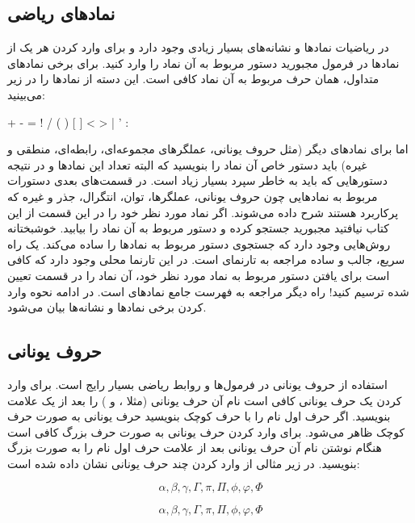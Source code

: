 \subsection{نمادهای ریاضی}
در ریاضیات نمادها و نشانه‌های بسیار زیادی وجود دارد و برای وارد کردن هر یک از
نمادها در فرمول مجبورید دستور مربوط به آن نماد را وارد کنید. برای برخی نمادهای
متداول، همان حرف مربوط به آن نماد کافی است. این دسته از نمادها را در زیر
می‌بینید:
\begin{latex}
+ - = ! / ( ) [ ] < > | ' :
\end{latex} 
اما برای نمادهای دیگر (مثل حروف یونانی، عملگرهای مجموعه‌ای، رابطه‌ای، منطقی و
غیره) باید دستور خاص آن نماد را بنویسید که البته تعداد این نمادها و در نتیجه
دستورهایی که باید به خاطر سپرد بسیار زیاد است. در قسمت‌های بعدی دستورات مربوط به
نمادهایی چون حروف یونانی، عملگرها، توان، انتگرال، جذر و غیره که پرکاربرد هستند
شرح داده می‌شوند. اگر نماد مورد نظر خود را در این قسمت از این کتاب نیافتید
مجبورید جستجو کرده و دستور مربوط به آن نماد را بیابید. خوشبختانه روش‌هایی وجود
دارد که جستجوی دستور مربوط به نمادها را ساده می‌کند. یک راه سریع، جالب و ساده
مراجعه به تارنمای  است. در این تارنما محلی
وجود دارد که کافی است برای یافتن دستور مربوط به نماد مورد نظر خود، آن نماد را در
قسمت تعیین شده ترسیم کنید! راه دیگر مراجعه به فهرست جامع نمادهای
\lr{\LaTeX}
است.
در ادامه نحوه وارد کردن برخی نمادها و نشانه‌ها بیان می‌شود.

\subsection{حروف یونانی}
استفاده از حروف یونانی در فرمول‌ها و روابط ریاضی بسیار رایج است. برای وارد کردن
یک حرف یونانی کافی است نام آن حرف یونانی (مثلا ،  و
) را بعد از یک علامت \lr{\textbackslash} بنویسید. اگر حرف اول نام را
با حرف کوچک  بنویسید حرف یونانی به صورت حرف کوچک ظاهر
می‌شود. برای وارد کردن حرف یونانی به صورت حرف بزرگ کافی
است هنگام نوشتن نام آن حرف یونانی بعد از علامت \lr{\textbackslash} حرف اول نام
را به صورت بزرگ بنویسید. در زیر مثالی از وارد کردن چند حرف یونانی نشان داده شده است:

\begin{latex}
\[
\alpha, \beta, \gamma, \Gamma, \pi, \Pi, \phi, \varphi, \Phi
\]
\end{latex}
\[
\alpha, \beta, \gamma, \Gamma, \pi, \Pi, \phi, \varphi, \Phi
\]

